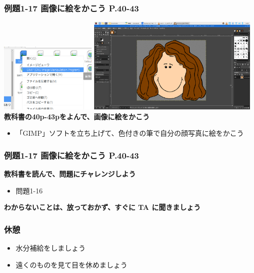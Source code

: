 \documentclass[dvipdfmx]{beamer}
\begin{document}
\begin{frame}[fragile]
	\frametitle{例題1-17 画像に絵をかこう P.40-43~~~}
  \includegraphics[width=0.35\textwidth]{textbook-img124.png}
  \hfill
  \includegraphics[width=0.62\textwidth]{textbook-img125.png}
  \vfill
  \large\textbf{教科書の40p-43pをよんで、画像に絵をかこう}
  \begin{itemize}
    \item 「GIMP」ソフトを立ち上げて、色付きの筆で自分の顔写真に絵をかこう
  \end{itemize}

\end{frame}

\begin{frame}[fragile]
	\frametitle{例題1-17 画像に絵をかこう P.40-43~~~}
          \large\textbf{教科書を読んで、問題にチャレンジしよう}
          \begin{itemize}
            \item 問題1-16
          \end{itemize}
          \vfill
          \large\textbf{わからないことは、放っておかず、すぐに TA に聞きましょう}
\end{frame}

\begin{frame}[fragile]
	\frametitle{休憩~~~}
	\huge
      \begin{itemize}
           \item 水分補給をしましょう
           \item 遠くのものを見て目を休めましょう
     \end{itemize}
\end{frame}
\end{document}
